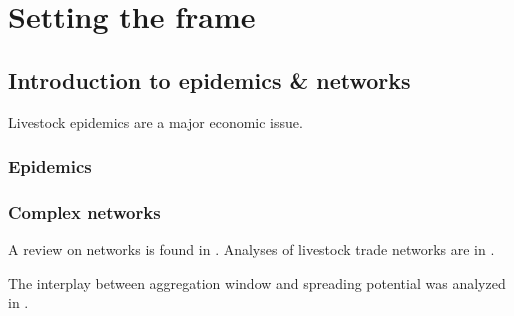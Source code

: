 \part{Setting the frame}

\chapter{Introduction to epidemics \& networks}
Livestock epidemics are a major economic issue.

\section{Epidemics}




\section{Complex networks}
A review on networks is found in \citet{Newman2003}.
Analyses of livestock trade networks are in \citet{Christley:2005}
\citet{Bigras:2007}\citet{Green:2006}.

The interplay between aggregation window and spreading potential was analyzed in \citet{Bajardi:2012}.


